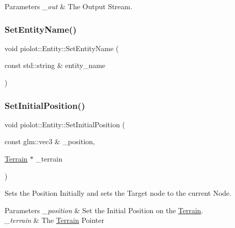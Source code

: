 \begin{DoxyParams}{Parameters}
{\em \+\_\+out} & The Output Stream. \\
\hline
\end{DoxyParams}
\mbox{\label{classpiolot_1_1_entity_a4b458394b15a68f6ecf19e79b60f8730}} 
\subsubsection{\texorpdfstring{Set\+Entity\+Name()}{SetEntityName()}}
{\footnotesize\ttfamily void piolot\+::\+Entity\+::\+Set\+Entity\+Name (\begin{DoxyParamCaption}\item[{const std\+::string \&}]{entity\+\_\+name }\end{DoxyParamCaption})\hspace{0.3cm}{\ttfamily [inline]}}

\mbox{\label{classpiolot_1_1_entity_a4084ce43ed70e5a9ec1f51d811cdcead}} 
\subsubsection{\texorpdfstring{Set\+Initial\+Position()}{SetInitialPosition()}}
{\footnotesize\ttfamily void piolot\+::\+Entity\+::\+Set\+Initial\+Position (\begin{DoxyParamCaption}\item[{const glm\+::vec3 \&}]{\+\_\+position,  }\item[{\mbox{\hyperlink{classpiolot_1_1_terrain}{Terrain}} $\ast$}]{\+\_\+terrain }\end{DoxyParamCaption})}



Sets the Position Initially and sets the Target node to the current Node. 


\begin{DoxyParams}{Parameters}
{\em \+\_\+position} & Set the Initial Position on the \mbox{\hyperlink{classpiolot_1_1_terrain}{Terrain}}. \\
\hline
{\em \+\_\+terrain} & The \mbox{\hyperlink{classpiolot_1_1_terrain}{Terrain}} Pointer \\
\hline
\end{DoxyParams}
\mbox{\label{classpiolot_1_1_entity_a575051c2dffebde6948c421bb9153c3c}} 
